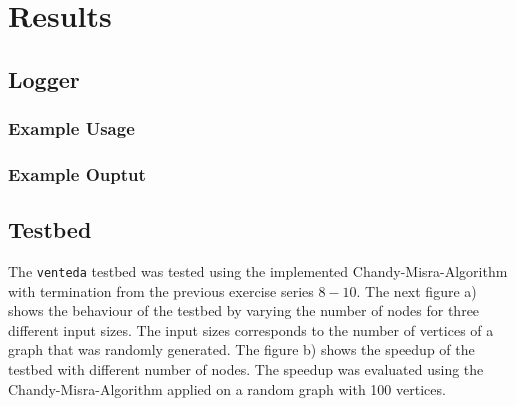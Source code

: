 \documentclass[10pt,a4wide]{article}
\begin{document}
\section{Results}
\subsection{Logger}
\subsubsection{Example Usage}
\subsubsection{Example Ouptut}

\subsection{Testbed}
The \texttt{venteda} testbed was tested using the implemented Chandy-Misra-Algorithm with termination from the previous exercise series $8-10$. The next figure a) shows the behaviour of the testbed by varying the number of nodes for three different input sizes. The input sizes corresponds to the number of vertices of a graph that was randomly generated. The figure b) shows the speedup of the testbed with different number of nodes. The speedup was evaluated using the Chandy-Misra-Algorithm applied on a random graph with 100 vertices.

\begin{figure}[!htb]
\centering
\hfill
{}
\hfill
\centering
{}
\hfill
\end{figure}
\end{document}
